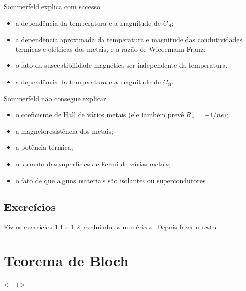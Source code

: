 \documentclass[a4paper,fleqn,12pt]{article}
\begin{document}
Sommerfeld explica com sucesso
\begin{itemize}
\item a dependência da temperatura e a magnitude de $C_{\text{el}}$;
\item a dependência aproximada da temperatura e magnitude das condutividades térmicas e elétricas dos metais, e a razão de Wiedemann-Franz;
\item o fato da susceptibilidade magnética ser independente da temperatura.
\item a dependência da temperatura e a magnitude de $C_{\text{el}}$.
\end{itemize}

Sommerfeld não consegue explicar
\begin{itemize}
\item o coeficiente de Hall de vários metais (ele também prevê $R_{\text{H}} = - 1/ne$);
\item a magnetoresistência dos metais;
\item a potência térmica;
\item o formato das superfícies de Fermi de vários metais;
\item o fato de que alguns materiais são isolantes ou supercondutores.
\end{itemize}

\subsection{Exercícios}

Fiz os exercícios 1.1 e 1.2, excluindo os numéricos. Depois fazer o resto.

\pagebreak

\section{Teorema de Bloch}

<++>
\end{document}
